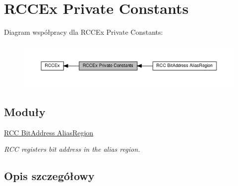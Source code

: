 \hypertarget{group___r_c_c_ex___private___constants}{}\section{R\+C\+C\+Ex Private Constants}
\label{group___r_c_c_ex___private___constants}
Diagram współpracy dla R\+C\+C\+Ex Private Constants\+:\nopagebreak
\begin{figure}[H]
\begin{center}
\leavevmode
\includegraphics[width=350pt]{group___r_c_c_ex___private___constants}
\end{center}
\end{figure}
\subsection*{Moduły}
\begin{DoxyCompactItemize}
\item 
\hyperlink{group___r_c_c_ex___bit_address___alias_region}{R\+C\+C Bit\+Address Alias\+Region}
\begin{DoxyCompactList}\small\item\em R\+CC registers bit address in the alias region. \end{DoxyCompactList}\end{DoxyCompactItemize}


\subsection{Opis szczegółowy}
